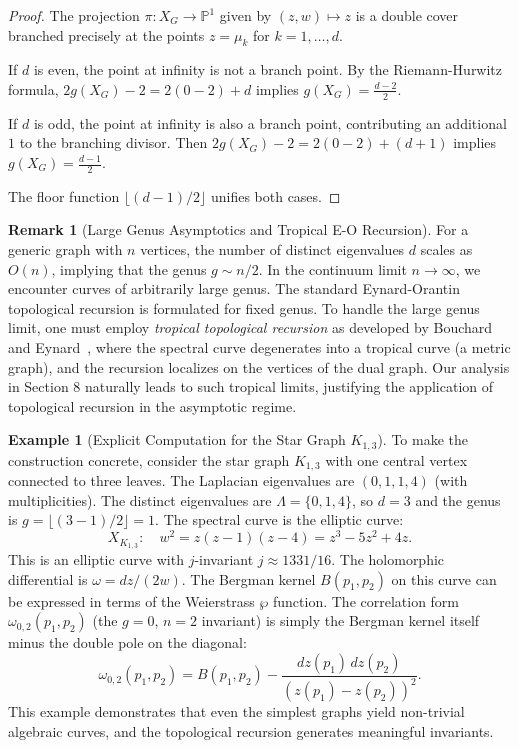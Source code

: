 \documentclass[12pt]{article}
\theoremstyle{definition}
\newtheorem{remark}[theorem]{Remark}
\newtheorem{example}[theorem]{Example}
\newcommand{\PP}{\mathbb{P}}
\begin{document}
\begin{proof}
The projection $\pi: X_G \to \PP^1$ given by $(z,w) \mapsto z$ is a double cover branched precisely at the points $z = \mu_k$ for $k = 1,\dots,d$.

If $d$ is even, the point at infinity is not a branch point. By the Riemann-Hurwitz formula,
$2g(X_G) - 2 = 2(0 - 2) + d$ implies $g(X_G) = \frac{d-2}{2}$.

If $d$ is odd, the point at infinity is also a branch point, contributing an additional $1$ to the branching divisor. Then
$2g(X_G) - 2 = 2(0 - 2) + (d + 1)$ implies $g(X_G) = \frac{d-1}{2}$.

The floor function $\lfloor (d-1)/2 \rfloor$ unifies both cases.
\end{proof}

\begin{remark}[Large Genus Asymptotics and Tropical E-O Recursion]\label{rem:large_genus}
For a generic graph with $n$ vertices, the number of distinct eigenvalues $d$ scales as $O(n)$, implying that the genus $g \sim n/2$. In the continuum limit $n \to \infty$, we encounter curves of arbitrarily large genus. The standard Eynard-Orantin topological recursion is formulated for fixed genus. To handle the large genus limit, one must employ \emph{tropical topological recursion} as developed by Bouchard and Eynard~\cite{Bouchard2015, Bouchard2018}, where the spectral curve degenerates into a tropical curve (a metric graph), and the recursion localizes on the vertices of the dual graph. Our analysis in Section 8 naturally leads to such tropical limits, justifying the application of topological recursion in the asymptotic regime.
\end{remark}

\begin{example}[Explicit Computation for the Star Graph $K_{1,3}$]\label{ex:star_graph}
To make the construction concrete, consider the star graph $K_{1,3}$ with one central vertex connected to three leaves. The Laplacian eigenvalues are $(0,1,1,4)$ (with multiplicities). The distinct eigenvalues are $\Lambda = \{0,1,4\}$, so $d = 3$ and the genus is $g = \lfloor (3-1)/2 \rfloor = 1$. The spectral curve is the elliptic curve:
\[
X_{K_{1,3}}: \quad w^2 = z(z-1)(z-4) = z^3 - 5z^2 + 4z.
\]
This is an elliptic curve with $j$-invariant $j \approx 1331/16$. The holomorphic differential is $\omega = dz/(2w)$. The Bergman kernel $B(p_1,p_2)$ on this curve can be expressed in terms of the Weierstrass $\wp$ function. The correlation form $\omega_{0,2}(p_1,p_2)$ (the $g=0$, $n=2$ invariant) is simply the Bergman kernel itself minus the double pole on the diagonal:
\[
\omega_{0,2}(p_1,p_2) = B(p_1,p_2) - \frac{dz(p_1)\, dz(p_2)}{(z(p_1) - z(p_2))^2}.
\]
This example demonstrates that even the simplest graphs yield non-trivial algebraic curves, and the topological recursion generates meaningful invariants.
\end{example}
\end{document}
